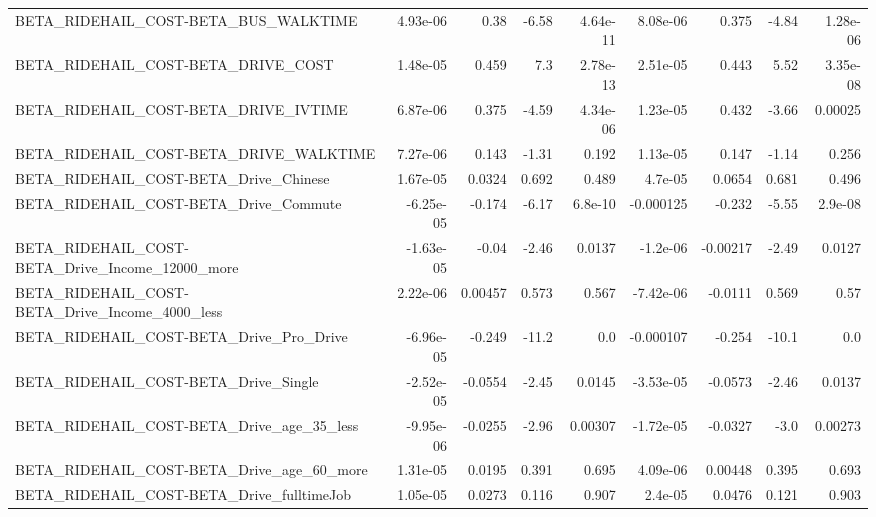 \begin{tabular}{lrrrrrrrr}
BETA\_RIDEHAIL\_COST-BETA\_BUS\_WALKTIME               &    4.93e-06 &         0.38 &     -6.58 & 4.64e-11 &   8.08e-06 &       0.375 &        -4.84 &      1.28e-06 \\
BETA\_RIDEHAIL\_COST-BETA\_DRIVE\_COST                 &    1.48e-05 &        0.459 &       7.3 & 2.78e-13 &   2.51e-05 &       0.443 &         5.52 &      3.35e-08 \\
BETA\_RIDEHAIL\_COST-BETA\_DRIVE\_IVTIME               &    6.87e-06 &        0.375 &     -4.59 & 4.34e-06 &   1.23e-05 &       0.432 &        -3.66 &       0.00025 \\
BETA\_RIDEHAIL\_COST-BETA\_DRIVE\_WALKTIME             &    7.27e-06 &        0.143 &     -1.31 &    0.192 &   1.13e-05 &       0.147 &        -1.14 &         0.256 \\
BETA\_RIDEHAIL\_COST-BETA\_Drive\_Chinese              &    1.67e-05 &       0.0324 &     0.692 &    0.489 &    4.7e-05 &      0.0654 &        0.681 &         0.496 \\
BETA\_RIDEHAIL\_COST-BETA\_Drive\_Commute              &   -6.25e-05 &       -0.174 &     -6.17 &  6.8e-10 &  -0.000125 &      -0.232 &        -5.55 &       2.9e-08 \\
BETA\_RIDEHAIL\_COST-BETA\_Drive\_Income\_12000\_more    &   -1.63e-05 &        -0.04 &     -2.46 &   0.0137 &   -1.2e-06 &    -0.00217 &        -2.49 &        0.0127 \\
BETA\_RIDEHAIL\_COST-BETA\_Drive\_Income\_4000\_less     &    2.22e-06 &      0.00457 &     0.573 &    0.567 &  -7.42e-06 &     -0.0111 &        0.569 &          0.57 \\
BETA\_RIDEHAIL\_COST-BETA\_Drive\_Pro\_Drive            &   -6.96e-05 &       -0.249 &     -11.2 &      0.0 &  -0.000107 &      -0.254 &        -10.1 &           0.0 \\
BETA\_RIDEHAIL\_COST-BETA\_Drive\_Single               &   -2.52e-05 &      -0.0554 &     -2.45 &   0.0145 &  -3.53e-05 &     -0.0573 &        -2.46 &        0.0137 \\
BETA\_RIDEHAIL\_COST-BETA\_Drive\_age\_35\_less          &   -9.95e-06 &      -0.0255 &     -2.96 &  0.00307 &  -1.72e-05 &     -0.0327 &         -3.0 &       0.00273 \\
BETA\_RIDEHAIL\_COST-BETA\_Drive\_age\_60\_more          &    1.31e-05 &       0.0195 &     0.391 &    0.695 &   4.09e-06 &     0.00448 &        0.395 &         0.693 \\
BETA\_RIDEHAIL\_COST-BETA\_Drive\_fulltimeJob          &    1.05e-05 &       0.0273 &     0.116 &    0.907 &    2.4e-05 &      0.0476 &        0.121 &         0.903 \\

\end{tabular}
